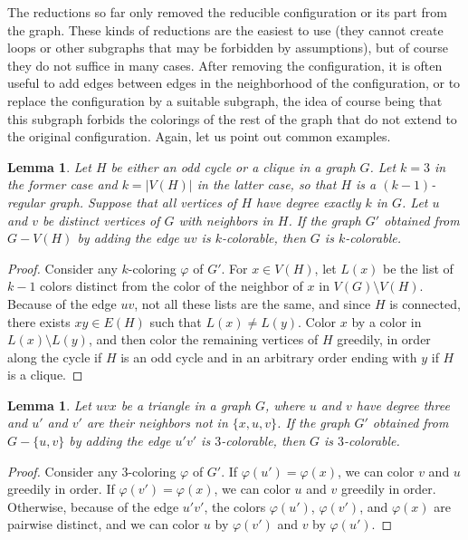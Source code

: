 \documentclass[12pt,twoside,openright,a4paper]{book}
\newtheorem{lemma}[theorem]{Lemma}
\begin{document}
The reductions so far only removed the reducible configuration or its part from the graph.  These kinds of reductions are the easiest
to use (they cannot create loops or other subgraphs that may be forbidden by assumptions), but of course they do not suffice in many cases.
After removing the configuration, it is often useful to add edges between edges in the neighborhood of the configuration, or to replace the
configuration by a suitable subgraph, the idea of course being that this subgraph forbids the colorings of the rest of the graph that do not
extend to the original configuration.  Again, let us point out common examples.
\begin{lemma}\label{lemma:oddclredu}
Let $H$ be either an odd cycle or a clique in a graph $G$.  Let $k=3$ in the former case and $k=|V(H)|$ in the latter case, so that $H$ is a $(k-1)$-regular graph.
Suppose that all vertices of $H$ have degree exactly $k$ in $G$.  Let $u$ and $v$ be distinct vertices of $G$ with neighbors in $H$.
If the graph $G'$ obtained from $G-V(H)$ by adding the edge $uv$ is $k$-colorable, then $G$ is $k$-colorable.
\end{lemma}
\begin{proof}
Consider any $k$-coloring $\varphi$ of $G'$.  For $x\in V(H)$, let $L(x)$ be the list of $k-1$ colors distinct from the color of the neighbor of $x$ in $V(G)\setminus V(H)$.
Because of the edge $uv$, not all these lists are the same, and since $H$ is connected, there exists $xy\in E(H)$ such that $L(x)\neq L(y)$.
Color $x$ by a color in $L(x)\setminus L(y)$, and then color the remaining vertices of $H$ greedily, in order along the cycle if $H$ is an odd cycle
and in an arbitrary order ending with $y$ if $H$ is a clique.
\end{proof}

\begin{lemma}\label{lemma:trian33}
Let $uvx$ be a triangle in a graph $G$, where $u$ and $v$ have degree three and $u'$ and $v'$ are their neighbors not in $\{x,u,v\}$.
If the graph $G'$ obtained from $G-\{u,v\}$ by adding the edge $u'v'$ is $3$-colorable, then $G$ is $3$-colorable.
\end{lemma}
\begin{proof}
Consider any $3$-coloring $\varphi$ of $G'$.  If $\varphi(u')=\varphi(x)$, we can color $v$ and $u$ greedily in order.
If $\varphi(v')=\varphi(x)$, we can color $u$ and $v$ greedily in order.  Otherwise, because of the edge $u'v'$,
the colors $\varphi(u')$, $\varphi(v')$, and $\varphi(x)$ are pairwise distinct, and we can color $u$ by $\varphi(v')$
and $v$ by $\varphi(u')$.
\end{proof}
\end{document}
